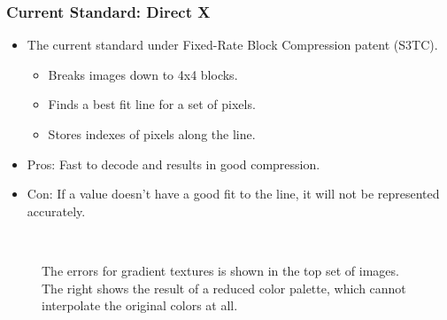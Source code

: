 \documentclass{beamer}
\begin{document}
\begin{frame}
   \frametitle{Current Standard: Direct X}
   \begin{itemize}
   \item{The current standard under Fixed-Rate Block Compression patent (S3TC).}
   \pause
      \begin{itemize}
      \item{Breaks images down to 4x4 blocks.}
      \pause
      \item{Finds a best fit line for a set of pixels.}
      \pause
      \item{Stores indexes of pixels along the line.}
      \pause
      \end{itemize}
   \item{Pros: Fast to decode and results in good compression.}
   \item{Con: If a value doesn't have a good fit to the line, it will not be represented accurately.}
   \end{itemize}
\end{frame}

\begin{frame}
   \begin{figure}[!htbp]
   \begin{center}
   \\
   \end{center}
   \caption{The errors for gradient textures is shown in the top set of images. The right shows the result of a reduced color palette, which cannot interpolate the original colors at all.}
   \end{figure}
\end{frame}
\end{document}
